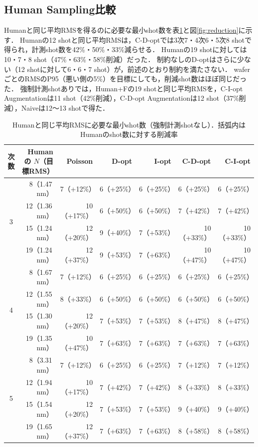 \documentclass[10.5pt,a4paper]{ltjsarticle}
\begin{document}
\subsection{Human Sampling比較}

Humanと同じ平均RMSを得るのに必要な最小shot数を表\ref{tab:reduction}と図\ref{fig:reduction}に示す．
Humanの12 shotと同じ平均RMSは，C-D-optでは3次7・4次6・5次8 shotで得られ，計測shot数を42\%・50\%・33\%減らせる．
Humanの19 shotに対しては10・7・8 shot（47\%・63\%・58\%削減）だった．
制約なしのD-optはさらに少ない（12 shotに対して6・6・7 shot）が，前述のとおり制約を満たさない．
waferごとのRMSのP95（悪い側の5\%）を目標にしても，削減shot数はほぼ同じだった．
強制計測shotありでは，Human+Fの19 shotと同じ平均RMSを，C-I-opt Augmentationは11 shot（42\%削減），C-D-opt Augmentationは12 shot（37\%削減），Naiveは12〜13 shotで得た．

\begin{table}[htbp]
  \centering
  \caption{Humanと同じ平均RMSに必要な最小shot数（強制計測shotなし）．括弧内はHumanのshot数に対する削減率}
  \label{tab:reduction}
  \small
\begin{tabular}{crrrrrr}
\toprule
次数 & Human の $N$（目標RMS） & Poisson & D-opt & I-opt & C-D-opt & C-I-opt \\
\midrule
\multirow{4}{*}{3} & 8（1.47\,nm） & 7（+12\%） & 6（+25\%） & 6（+25\%） & 6（+25\%） & 6（+25\%） \\
 & 12（1.36\,nm） & 10（+17\%） & 6（+50\%） & 6（+50\%） & 7（+42\%） & 7（+42\%） \\
 & 15（1.24\,nm） & 12（+20\%） & 9（+40\%） & 7（+53\%） & 10（+33\%） & 10（+33\%） \\
 & 19（1.24\,nm） & 12（+37\%） & 9（+53\%） & 7（+63\%） & 10（+47\%） & 10（+47\%） \\
\midrule
\multirow{4}{*}{4} & 8（1.67\,nm） & 7（+12\%） & 6（+25\%） & 6（+25\%） & 6（+25\%） & 6（+25\%） \\
 & 12（1.55\,nm） & 8（+33\%） & 6（+50\%） & 6（+50\%） & 6（+50\%） & 6（+50\%） \\
 & 15（1.30\,nm） & 12（+20\%） & 7（+53\%） & 7（+53\%） & 8（+47\%） & 8（+47\%） \\
 & 19（1.35\,nm） & 10（+47\%） & 7（+63\%） & 7（+63\%） & 7（+63\%） & 7（+63\%） \\
\midrule
\multirow{4}{*}{5} & 8（3.31\,nm） & 7（+12\%） & 6（+25\%） & 6（+25\%） & 7（+12\%） & 7（+12\%） \\
 & 12（1.94\,nm） & 10（+17\%） & 7（+42\%） & 7（+42\%） & 8（+33\%） & 8（+33\%） \\
 & 15（1.54\,nm） & 12（+20\%） & 7（+53\%） & 7（+53\%） & 9（+40\%） & 9（+40\%） \\
 & 19（1.65\,nm） & 12（+37\%） & 7（+63\%） & 7（+63\%） & 8（+58\%） & 8（+58\%） \\
\bottomrule
\end{tabular}
\end{table}
\end{document}
